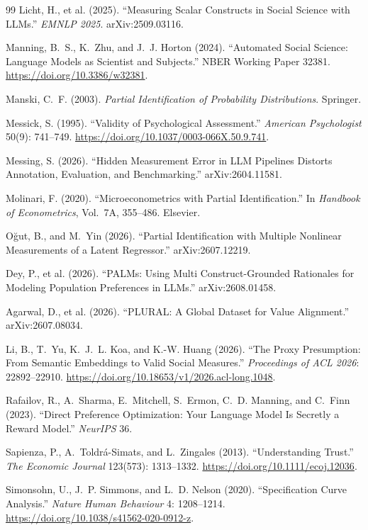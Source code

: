 \documentclass[10pt,letterpaper]{article}
\begin{document}
\begin{thebibliography}{99}
 Licht, H., et al. (2025). ``Measuring Scalar Constructs in Social Science with LLMs.'' \textit{EMNLP 2025}. arXiv:2509.03116.

 Manning, B.~S., K.~Zhu, and J.~J. Horton (2024). ``Automated Social Science: Language Models as Scientist and Subjects.'' NBER Working Paper 32381. \url{https://doi.org/10.3386/w32381}.

 Manski, C.~F. (2003). \textit{Partial Identification of Probability Distributions}. Springer.

 Messick, S. (1995). ``Validity of Psychological Assessment.'' \textit{American Psychologist} 50(9): 741--749. \url{https://doi.org/10.1037/0003-066X.50.9.741}.

 Messing, S. (2026). ``Hidden Measurement Error in LLM Pipelines Distorts Annotation, Evaluation, and Benchmarking.'' arXiv:2604.11581.

 Molinari, F. (2020). ``Microeconometrics with Partial Identification.'' In \textit{Handbook of Econometrics}, Vol.~7A, 355--486. Elsevier.

 O\u{g}ut, B., and M.~Yin (2026). ``Partial Identification with Multiple Nonlinear Measurements of a Latent Regressor.'' arXiv:2607.12219.

 Dey, P., et al. (2026). ``PALMs: Using Multi Construct-Grounded Rationales for Modeling Population Preferences in LLMs.'' arXiv:2608.01458.

 Agarwal, D., et al. (2026). ``PLURAL: A Global Dataset for Value Alignment.'' arXiv:2607.08034.

 Li, B., T.~Yu, K.~J.~L. Koa, and K.-W. Huang (2026). ``The Proxy Presumption: From Semantic Embeddings to Valid Social Measures.'' \textit{Proceedings of ACL 2026}: 22892--22910. \url{https://doi.org/10.18653/v1/2026.acl-long.1048}.

 Rafailov, R., A.~Sharma, E.~Mitchell, S.~Ermon, C.~D. Manning, and C.~Finn (2023). ``Direct Preference Optimization: Your Language Model Is Secretly a Reward Model.'' \textit{NeurIPS} 36.

 Sapienza, P., A.~Toldr\'a-Simats, and L.~Zingales (2013). ``Understanding Trust.'' \textit{The Economic Journal} 123(573): 1313--1332. \url{https://doi.org/10.1111/ecoj.12036}.

 Simonsohn, U., J.~P. Simmons, and L.~D. Nelson (2020). ``Specification Curve Analysis.'' \textit{Nature Human Behaviour} 4: 1208--1214. \url{https://doi.org/10.1038/s41562-020-0912-z}.


\end{thebibliography}
\end{document}
